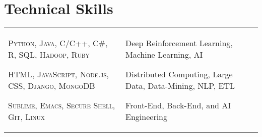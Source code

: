 \documentclass[a4paper,10pt]{article}
\begin{document}
\section{Technical Skills}
\begin{supertabular}{p{8.65cm} p{8.65cm}}

	\begin{enumerate*}[label =$\circ$, itemjoin={\newline}]
																\item \small \textsc{Python, Java, C/C++, C\#, R, SQL, Hadoop, Ruby}
																\item \small \textsc{HTML, JavaScript, Node.js, CSS, Django, MongoDB}
																\item \small \textsc{Sublime, Emacs, Secure Shell, Git, Linux}
																\end{enumerate*}


	& \begin{enumerate*}[label =$\circ$, itemjoin={\newline}]
                                \item \small Deep Reinforcement Learning, Machine Learning, AI
                                \item \small Distributed Computing, Large Data, Data-Mining, NLP, ETL
                                \item \small Front-End, Back-End, and AI Engineering \end{enumerate*}  \vspace{1mm} \\



\end{supertabular}
\end{document}
